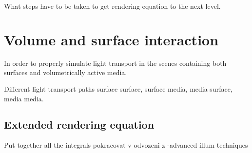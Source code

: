 What steps have to be taken to get rendering equation to the next level.

\section{Volume and surface interaction}
In order to properly simulate light transport in the scenes containing both surfaces and volumetrically active media.

Different light transport paths surface surface, surface media, media surface, media media.

\subsection{Extended rendering equation}
Put together all the integrals
pokracovat v odvozeni z -advanced illum techniques





